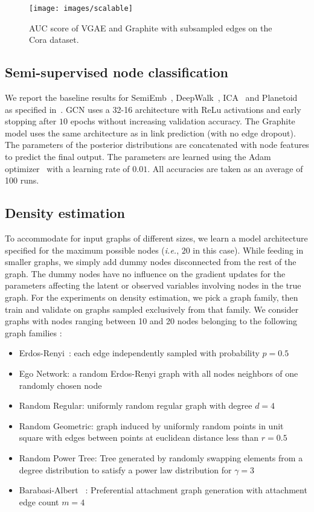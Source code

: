 \documentclass{article}
\newcommand{\name}{Graphite}
\begin{document}
 


\begin{figure}[t]
\centering
\texttt{[image: images/scalable]}
\caption{AUC score of VGAE and Graphite with subsampled edges on the Cora dataset.}\label{fig:scalability} 
\end{figure}

\subsection{Semi-supervised node classification}

We report the baseline results for  SemiEmb~\citep{weston2008embedding},  DeepWalk~\citep{perozzi2014deepwalk}, ICA~\citep{lu2003classification} and  Planetoid~\citep{yang2016embeddings} as specified in~\citep{kipf2016semi}.  GCN uses a 32-16 architecture with ReLu activations and early stopping after $10$ epochs without increasing validation accuracy.  The \name{} model uses the same architecture as in link prediction (with no edge dropout). The parameters of the posterior distributions are concatenated with node features to predict the final output.  The parameters are learned using the Adam optimizer~\citep{kingma2013auto} with a learning rate of $0.01$. All accuracies are taken as an average of 100 runs.

\subsection{Density estimation}
To accommodate for input graphs of different sizes, we learn a model architecture specified for the maximum possible nodes (\textit{i.e.}, $20$ in this case). While feeding in smaller graphs, we simply add dummy nodes disconnected from the rest of the graph. The dummy nodes have no influence on the gradient updates for the parameters affecting the latent or observed variables involving nodes in the true graph.
For the experiments on density estimation, we pick a graph family, then train and validate on graphs sampled exclusively from that family.  We consider graphs with nodes ranging between 10 and 20 nodes belonging to the following graph families :
\begin{itemize}
\item Erdos-Renyi~\citep{erdos1959random}: each edge independently sampled with probability $p = 0.5$
\item Ego Network: a random Erdos-Renyi graph with all nodes neighbors of one randomly chosen node
\item Random Regular: uniformly random regular graph with degree $d = 4$
\item Random Geometric: graph induced by uniformly random points in unit square with edges between points at euclidean distance less than $r = 0.5$
\item Random Power Tree: Tree generated by randomly swapping elements from a degree distribution to satisfy a power law distribution for $\gamma = 3$
\item Barabasi-Albert ~\citep{barabasi1999random}: Preferential attachment graph generation with attachment edge count $m = 4$
\end{itemize}
\end{document}

